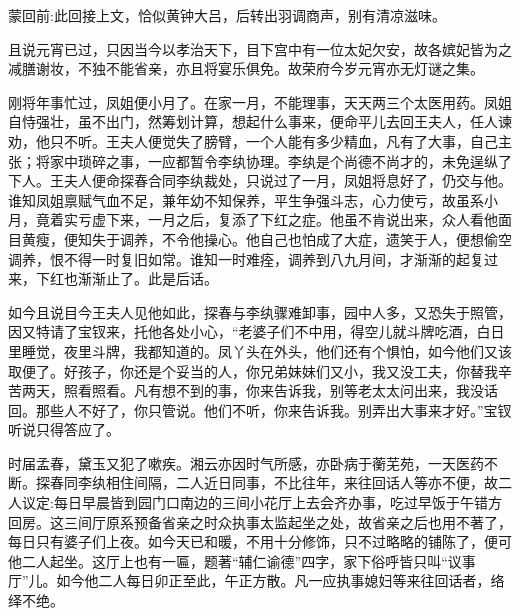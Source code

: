 
\begin{parag}
    \begin{note}蒙回前:此回接上文，恰似黄钟大吕，后转出羽调商声，别有清凉滋味。\end{note}
\end{parag}


\begin{parag}
    且说元宵已过，只因当今以孝治天下，目下宫中有一位太妃欠安，故各嫔妃皆为之减膳谢妆，不独不能省亲，亦且将宴乐俱免。故荣府今岁元宵亦无灯谜之集。
\end{parag}


\begin{parag}
    刚将年事忙过，凤姐便小月了。在家一月，不能理事，天天两三个太医用药。凤姐自恃强壮，虽不出门，然筹划计算，想起什么事来，便命平儿去回王夫人，任人谏劝，他只不听。王夫人便觉失了膀臂，一个人能有多少精血，凡有了大事，自己主张；将家中琐碎之事，一应都暂令李纨协理。李纨是个尚德不尚才的，未免逞纵了下人。王夫人便命探春合同李纨裁处，只说过了一月，凤姐将息好了，仍交与他。谁知凤姐禀赋气血不足，兼年幼不知保养，平生争强斗志，心力使亏，故虽系小月，竟着实亏虚下来，一月之后，复添了下红之症。他虽不肯说出来，众人看他面目黄瘦，便知失于调养，不令他操心。他自己也怕成了大症，遗笑于人，便想偷空调养，恨不得一时复旧如常。谁知一时难痊，调养到八九月间，才渐渐的起复过来，下红也渐渐止了。此是后话。
\end{parag}


\begin{parag}
    如今且说目今王夫人见他如此，探春与李纨骤难卸事，园中人多，又恐失于照管，因又特请了宝钗来，托他各处小心，“老婆子们不中用，得空儿就斗牌吃酒，白日里睡觉，夜里斗牌，我都知道的。凤丫头在外头，他们还有个惧怕，如今他们又该取便了。好孩子，你还是个妥当的人，你兄弟妹妹们又小，我又没工夫，你替我辛苦两天，照看照看。凡有想不到的事，你来告诉我，别等老太太问出来，我没话回。那些人不好了，你只管说。他们不听，你来告诉我。别弄出大事来才好。”宝钗听说只得答应了。
\end{parag}


\begin{parag}
    时届孟春，黛玉又犯了嗽疾。湘云亦因时气所感，亦卧病于蘅芜苑，一天医药不断。探春同李纨相住间隔，二人近日同事，不比往年，来往回话人等亦不便，故二人议定:每日早晨皆到园门口南边的三间小花厅上去会齐办事，吃过早饭于午错方回房。这三间厅原系预备省亲之时众执事太监起坐之处，故省亲之后也用不著了，每日只有婆子们上夜。如今天已和暖，不用十分修饰，只不过略略的铺陈了，便可他二人起坐。这厅上也有一匾，题著“辅仁谕德”四字，家下俗呼皆只叫“议事厅”儿。如今他二人每日卯正至此，午正方散。凡一应执事媳妇等来往回话者，络绎不绝。
\end{parag}


